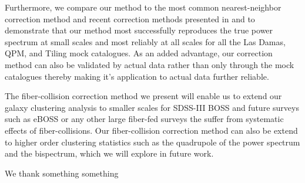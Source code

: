 \documentclass{emulateapj}
\begin{document}
Furthermore, we compare our method to the most common nearest-neighbor correction method and recent correction methods presented in \cite{Beutler:2014aa} and \cite{Gil-Marin:2014aa} to demonstrate that our method most successfully reproduces the true power spectrum at small scales and most reliably at all scales for all the Las Damas, QPM, and Tiling mock catalogues. As an added advantage, our correction method can also be validated by actual data rather than only through the mock catalogues thereby making it's application to actual data further reliable. 

The fiber-collision correction method we present will enable us to extend our galaxy clustering analysis to smaller scales for SDSS-III BOSS and future surveys such as eBOSS or any other large fiber-fed surveys the suffer from systematic effects of fiber-collisions. Our fiber-collision correction method can also be extend to higher order clustering statistics such as the quadrupole of the power spectrum and the bispectrum, which we will explore in future work. 

\bigskip
We thank something something



\end{document}
